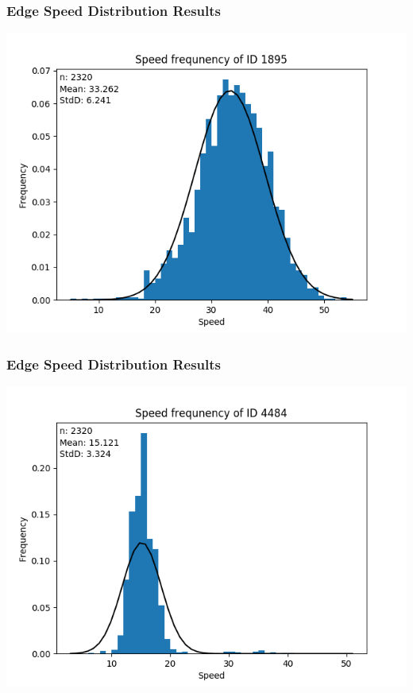 \documentclass{beamer}
\begin{document}
	\begin{frame}
		\frametitle{Edge Speed Distribution Results}
		\includegraphics[width=\textwidth,height=\textheight,keepaspectratio]{logResGood.png}
	\end{frame}
	\begin{frame}
		\frametitle{Edge Speed Distribution Results}
		\includegraphics[width=\textwidth,height=\textheight,keepaspectratio]{logResEh1.png}
	\end{frame}
\end{document}
